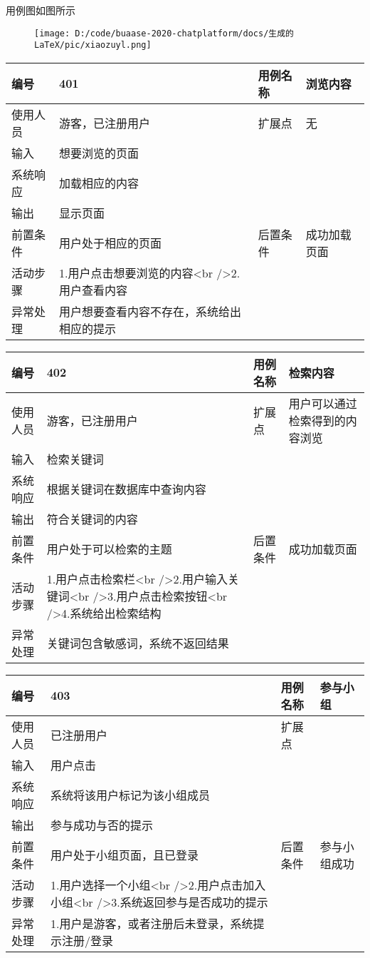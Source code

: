 \documentclass[
]{article}
\begin{document}
用例图如图所示

\begin{figure}
\centering
\texttt{[image: D:/code/buaase-2020-chatplatform/docs/生成的LaTeX/pic/xiaozuyl.png]}
\caption{}
\end{figure}

\begin{longtable}[]{@{}llll@{}}
\toprule
编号 & 401 & 用例名称 & 浏览内容\tabularnewline
\midrule
\endhead
使用人员 & 游客，已注册用户 & 扩展点 & 无\tabularnewline
输入 & 想要浏览的页面 & &\tabularnewline
系统响应 & 加载相应的内容 & &\tabularnewline
输出 & 显示页面 & &\tabularnewline
前置条件 & 用户处于相应的页面 & 后置条件 & 成功加载页面\tabularnewline
活动步骤 & 1.用户点击想要浏览的内容\textless br
/\textgreater{}2.用户查看内容 & &\tabularnewline
异常处理 & 用户想要查看内容不存在，系统给出相应的提示 & &\tabularnewline
\bottomrule
\end{longtable}

\begin{longtable}[]{@{}llll@{}}
\toprule
编号 & 402 & 用例名称 & 检索内容\tabularnewline
\midrule
\endhead
使用人员 & 游客，已注册用户 & 扩展点 &
用户可以通过检索得到的内容浏览\tabularnewline
输入 & 检索关键词 & &\tabularnewline
系统响应 & 根据关键词在数据库中查询内容 & &\tabularnewline
输出 & 符合关键词的内容 & &\tabularnewline
前置条件 & 用户处于可以检索的主题 & 后置条件 &
成功加载页面\tabularnewline
活动步骤 & 1.用户点击检索栏\textless br
/\textgreater{}2.用户输入关键词\textless br
/\textgreater{}3.用户点击检索按钮\textless br
/\textgreater{}4.系统给出检索结构 & &\tabularnewline
异常处理 & 关键词包含敏感词，系统不返回结果 & &\tabularnewline
\bottomrule
\end{longtable}

\begin{longtable}[]{@{}llll@{}}
\toprule
编号 & 403 & 用例名称 & 参与小组\tabularnewline
\midrule
\endhead
使用人员 & 已注册用户 & 扩展点 &\tabularnewline
输入 & 用户点击 & &\tabularnewline
系统响应 & 系统将该用户标记为该小组成员 & &\tabularnewline
输出 & 参与成功与否的提示 & &\tabularnewline
前置条件 & 用户处于小组页面，且已登录 & 后置条件 &
参与小组成功\tabularnewline
活动步骤 & 1.用户选择一个小组\textless br
/\textgreater{}2.用户点击加入小组\textless br
/\textgreater{}3.系统返回参与是否成功的提示 & &\tabularnewline
异常处理 & 1.用户是游客，或者注册后未登录，系统提示注册/登录 &
&\tabularnewline
\bottomrule
\end{longtable}
\end{document}
